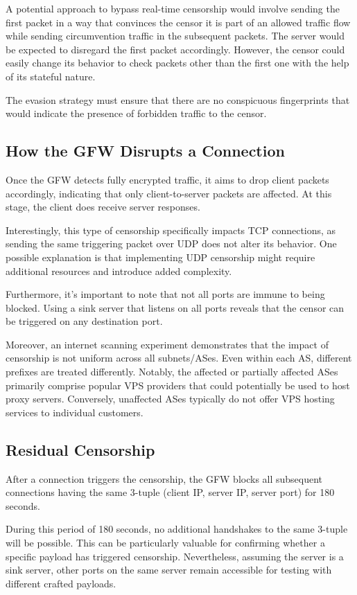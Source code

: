 A potential approach to bypass real-time censorship would involve sending the first packet in a way that convinces the censor it is part of an allowed traffic flow while sending circumvention traffic in the subsequent packets. The server would be expected to disregard the first packet accordingly. However, the censor could easily change its behavior to check packets other than the first one with the help of its stateful nature.

The evasion strategy must ensure that there are no conspicuous fingerprints that would indicate the presence of forbidden traffic to the censor.

\subsection{How the GFW Disrupts a Connection}
Once the GFW detects fully encrypted traffic, it aims to drop client packets accordingly, indicating that only client-to-server packets are affected. At this stage, the client does receive server responses.

Interestingly, this type of censorship specifically impacts TCP connections, as sending the same triggering packet over UDP does not alter its behavior. One possible explanation is that implementing UDP censorship might require additional resources and introduce added complexity.

Furthermore, it's important to note that not all ports are immune to being blocked. Using a sink server that listens on all ports reveals that the censor can be triggered on any destination port.

Moreover, an internet scanning experiment demonstrates that the impact of censorship is not uniform across all subnets/ASes. Even within each AS, different prefixes are treated differently. Notably, the affected or partially affected ASes primarily comprise popular VPS providers that could potentially be used to host proxy servers. Conversely, unaffected ASes typically do not offer VPS hosting services to individual customers.\cite{wu2023great}

\subsection{Residual Censorship}
After a connection triggers the censorship, the GFW blocks all subsequent connections having the same 3-tuple (client IP, server IP, server port) for 180 seconds.\cite{wu2023great}

During this period of 180 seconds, no additional handshakes to the same 3-tuple will be possible. This can be particularly valuable for confirming whether a specific payload has triggered censorship. Nevertheless, assuming the server is a sink server, other ports on the same server remain accessible for testing with different crafted payloads. 

